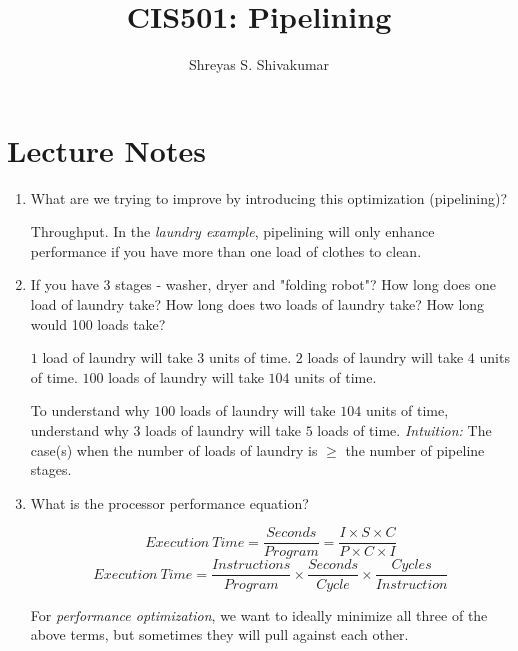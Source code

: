 \documentclass[12pt]{article}
\title{CIS501: Pipelining}
\author[1]{Shreyas S. Shivakumar}
\newenvironment{QandA}{\begin{enumerate}[label=\bfseries\alph*.]\bfseries}
                      {\end{enumerate}}
\newenvironment{answered}{\par\quad\normalfont}{}
\begin{document}
\maketitle

\section{Lecture Notes}

\begin{QandA}
   \item What are we trying to improve by introducing this optimization (pipelining)?
        \begin{answered}
        Throughput. In the \textit{laundry example}, pipelining will only enhance performance if you have more than one load of clothes to clean.
        \end{answered}
        
    \item If you have 3 stages - washer, dryer and "folding robot"? How long does one load of laundry take? How long does two loads of laundry take? How long would 100 loads take?
        \begin{answered}
            $1$ load of laundry will take $3$ units of time. $2$ loads of laundry will take $4$ units of time. $100$ loads of laundry will take $104$ units of time. 
            
            To understand why $100$ loads of laundry will take $104$ units of time, understand why $3$ loads of laundry will take $5$ loads of time. \textit{Intuition:} The case(s) when the number of loads of laundry is $\geq$ the number of pipeline stages.
        \end{answered}
        
    \item What is the processor performance equation?
    \begin{answered}
    \begin{equation*}
        Execution\ Time = \frac{Seconds}{Program} = \frac{I \times S \times C}{P \times C \times I}
    \end{equation*}
    \begin{equation*}
        Execution\ Time = \frac{Instructions}{Program} \times \frac{Seconds}{Cycle} \times \frac{Cycles}{Instruction}
    \end{equation*}
    
    For \textit{performance optimization}, we want to ideally minimize all three of the above terms, but sometimes they will pull against each other.
    

\end{answered}
\end{QandA}
\end{document}
